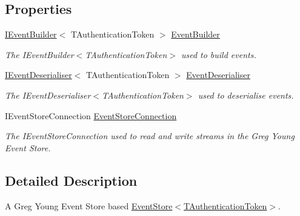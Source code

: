 \subsection*{Properties}
\begin{DoxyCompactItemize}
\item 
\hyperlink{interfaceCqrs_1_1EventStore_1_1IEventBuilder}{I\+Event\+Builder}$<$ T\+Authentication\+Token $>$ \hyperlink{classCqrs_1_1EventStore_1_1EventStore_ae1bc9d364582e951ccdc0f91908b94a2_ae1bc9d364582e951ccdc0f91908b94a2}{Event\+Builder}
\begin{DoxyCompactList}\small\item\em The I\+Event\+Builder$<$\+T\+Authentication\+Token$>$ used to build events. \end{DoxyCompactList}\item 
\hyperlink{interfaceCqrs_1_1EventStore_1_1IEventDeserialiser}{I\+Event\+Deserialiser}$<$ T\+Authentication\+Token $>$ \hyperlink{classCqrs_1_1EventStore_1_1EventStore_a2b9140681d6bd25afb3a842e4cbf37cf_a2b9140681d6bd25afb3a842e4cbf37cf}{Event\+Deserialiser}
\begin{DoxyCompactList}\small\item\em The I\+Event\+Deserialiser$<$\+T\+Authentication\+Token$>$ used to deserialise events. \end{DoxyCompactList}\item 
I\+Event\+Store\+Connection \hyperlink{classCqrs_1_1EventStore_1_1EventStore_ab1184aea49c7b0009a8f27d38f585952_ab1184aea49c7b0009a8f27d38f585952}{Event\+Store\+Connection}
\begin{DoxyCompactList}\small\item\em The I\+Event\+Store\+Connection used to read and write streams in the Greg Young Event Store. \end{DoxyCompactList}\end{DoxyCompactItemize}


\subsection{Detailed Description}
A Greg Young Event Store based \hyperlink{classCqrs_1_1EventStore_1_1EventStore_ab48ad2c9d72780ae3a662e213498f194_ab48ad2c9d72780ae3a662e213498f194}{Event\+Store$<$\+T\+Authentication\+Token$>$}. 


